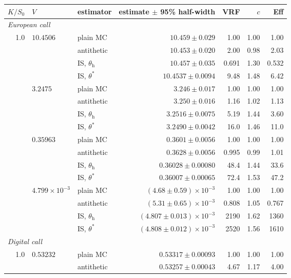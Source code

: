 \begin{tabular}{rllrrrr}
\toprule
$K/S_0$ & $V$ & estimator & estimate $\pm$ 95\% half-width & VRF & $c$ & Eff \\
\midrule
\multicolumn{7}{l}{\emph{European call}} \\
1.0 & $10.4506$ & plain MC & $10.459 \pm 0.029$ & 1.00 & 1.00 & 1.00 \\
 &  & antithetic & $10.453 \pm 0.020$ & 2.00 & 0.98 & 2.03 \\
 &  & IS, $\theta_{\mathrm{h}}$ & $10.457 \pm 0.035$ & 0.691 & 1.30 & 0.532 \\
 &  & IS, $\theta^*$ & $10.4537 \pm 0.0094$ & 9.48 & 1.48 & 6.42 \\
\addlinespace
1.2 & $3.2475$ & plain MC & $3.246 \pm 0.017$ & 1.00 & 1.00 & 1.00 \\
 &  & antithetic & $3.250 \pm 0.016$ & 1.16 & 1.02 & 1.13 \\
 &  & IS, $\theta_{\mathrm{h}}$ & $3.2516 \pm 0.0075$ & 5.19 & 1.44 & 3.60 \\
 &  & IS, $\theta^*$ & $3.2490 \pm 0.0042$ & 16.0 & 1.46 & 11.0 \\
\addlinespace
1.5 & $0.35963$ & plain MC & $0.3601 \pm 0.0056$ & 1.00 & 1.00 & 1.00 \\
 &  & antithetic & $0.3628 \pm 0.0056$ & 0.995 & 0.99 & 1.01 \\
 &  & IS, $\theta_{\mathrm{h}}$ & $0.36028 \pm 0.00080$ & 48.4 & 1.44 & 33.6 \\
 &  & IS, $\theta^*$ & $0.36007 \pm 0.00065$ & 72.4 & 1.53 & 47.2 \\
\addlinespace
2.0 & $4.799 \times 10^{-3}$ & plain MC & $(4.68 \pm 0.59) \times 10^{-3}$ & 1.00 & 1.00 & 1.00 \\
 &  & antithetic & $(5.31 \pm 0.65) \times 10^{-3}$ & 0.808 & 1.05 & 0.767 \\
 &  & IS, $\theta_{\mathrm{h}}$ & $(4.807 \pm 0.013) \times 10^{-3}$ & 2190 & 1.62 & 1360 \\
 &  & IS, $\theta^*$ & $(4.808 \pm 0.012) \times 10^{-3}$ & 2520 & 1.56 & 1610 \\
\midrule
\multicolumn{7}{l}{\emph{Digital call}} \\
1.0 & $0.53232$ & plain MC & $0.53317 \pm 0.00093$ & 1.00 & 1.00 & 1.00 \\
 &  & antithetic & $0.53257 \pm 0.00043$ & 4.67 & 1.17 & 4.00 \\

\end{tabular}
